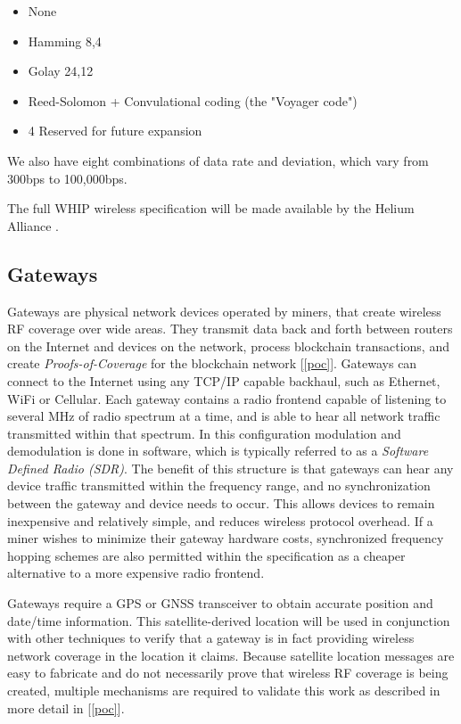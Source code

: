 \documentclass[letterpaper,11pt]{article}
\begin{document}
\begin{itemize}
	\item None
	\item Hamming 8,4
	\item Golay 24,12
	\item Reed-Solomon + Convulational coding (the "Voyager code")
	\item 4 Reserved for future expansion
\end{itemize}

We also have eight combinations of data rate and deviation, which vary from 300bps to 100,000bps.\newline

The full WHIP wireless specification will be made available by the Helium Alliance \cite{alliance}.

\subsection{Gateways} \label{gateways}

Gateways are physical network devices operated by miners, that create wireless RF coverage over wide areas. They transmit data back and forth between routers on the Internet and devices on the network, process blockchain transactions, and create \emph{Proofs-of-Coverage} for the blockchain network [\ref{poc}]. Gateways can connect to the Internet using any TCP/IP capable backhaul, such as Ethernet, WiFi or Cellular. Each gateway contains a radio frontend capable of listening to several MHz of radio spectrum at a time, and is able to hear all network traffic transmitted within that spectrum. In this configuration modulation and demodulation is done in software, which is typically referred to as a \emph{Software Defined Radio (SDR)}. The benefit of this structure is that gateways can hear any device traffic transmitted within the frequency range, and no synchronization between the gateway and device needs to occur. This allows devices to remain inexpensive and relatively simple, and reduces wireless protocol overhead. If a miner wishes to minimize their gateway hardware costs, synchronized frequency hopping schemes are also permitted within the specification as a cheaper alternative to a more expensive radio frontend.\newline

Gateways require a GPS or GNSS transceiver to obtain accurate position and date/time information. This satellite-derived location will be used in conjunction with other techniques to verify that a gateway is in fact providing wireless network coverage in the location it claims. Because satellite location messages are easy to fabricate and do not necessarily prove that wireless RF coverage is being created, multiple mechanisms are required to validate this work as described in more detail in [\ref{poc}].\newline
\end{document}

